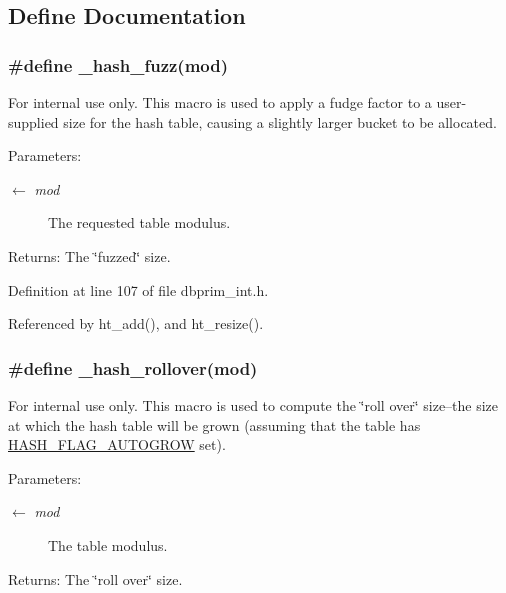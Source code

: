 \subsection{Define Documentation}
\hypertarget{group__dbprim__hash_ga49}{
\subsubsection[\_\-hash\_\-fuzz]{\setlength{\rightskip}{0pt plus 5cm}\#define \_\-hash\_\-fuzz(mod)}}
\label{group__dbprim__hash_ga49}


\begin{Desc}
\item[For internal use only.]
This macro is used to apply a fudge factor to a user-supplied size for the hash table, causing a slightly larger bucket to be allocated.

\begin{Desc}
\item[Parameters:]
\begin{description}
\item[\mbox{$\leftarrow$} {\em mod}]The requested table modulus.\end{description}
\end{Desc}
\begin{Desc}
\item[Returns:]The \char`\"{}fuzzed\char`\"{} size.\end{Desc}
\end{Desc}


Definition at line 107 of file dbprim\_\-int.h.

Referenced by ht\_\-add(), and ht\_\-resize().\hypertarget{group__dbprim__hash_ga47}{
\subsubsection[\_\-hash\_\-rollover]{\setlength{\rightskip}{0pt plus 5cm}\#define \_\-hash\_\-rollover(mod)}}
\label{group__dbprim__hash_ga47}


\begin{Desc}
\item[For internal use only.]
This macro is used to compute the \char`\"{}roll over\char`\"{} size--the size at which the hash table will be grown (assuming that the table has \hyperlink{group__dbprim__hash_ga23}{HASH\_\-FLAG\_\-AUTOGROW} set).

\begin{Desc}
\item[Parameters:]
\begin{description}
\item[\mbox{$\leftarrow$} {\em mod}]The table modulus.\end{description}
\end{Desc}
\begin{Desc}
\item[Returns:]The \char`\"{}roll over\char`\"{} size.\end{Desc}
\end{Desc}


